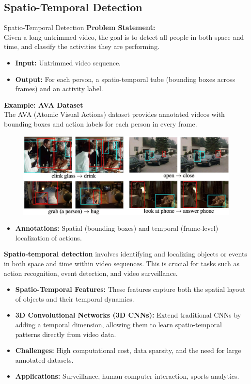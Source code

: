\subsection{Spatio-Temporal Detection}
\begin{frame}[allowframebreaks]{Spatio-Temporal Detection}
    \textbf{Problem Statement:} \\
    Given a long untrimmed video, the goal is to detect all people in both space and time, and classify the activities they are performing.

    \begin{itemize}
        \item \textbf{Input:} Untrimmed video sequence.
        \item \textbf{Output:} For each person, a spatio-temporal tube (bounding boxes across frames) and an activity label.
    \end{itemize}
\framebreak
    \textbf{Example: AVA Dataset} \\
    The AVA (Atomic Visual Actions) dataset provides annotated videos with bounding boxes and action labels for each person in every frame.

    \begin{figure}
        \centering
        \includegraphics[width=1\textwidth,height=0.9\textheight,keepaspectratio]{images/video/slide_40_1_img.jpg}
    \end{figure}
    \begin{itemize}
        \item \textbf{Annotations:} Spatial (bounding boxes) and temporal (frame-level) localization of actions.
    \end{itemize}
\framebreak
    \textbf{Spatio-temporal detection} involves identifying and localizing objects or events in both space and time within video sequences. This is crucial for tasks such as action recognition, event detection, and video surveillance.

    \begin{itemize}
        \item \textbf{Spatio-Temporal Features:} These features capture both the spatial layout of objects and their temporal dynamics.
        \item \textbf{3D Convolutional Networks (3D CNNs):} Extend traditional CNNs by adding a temporal dimension, allowing them to learn spatio-temporal patterns directly from video data.
        \item \textbf{Challenges:} High computational cost, data sparsity, and the need for large annotated datasets.
        \item \textbf{Applications:} Surveillance, human-computer interaction, sports analytics.
    \end{itemize}
\end{frame}